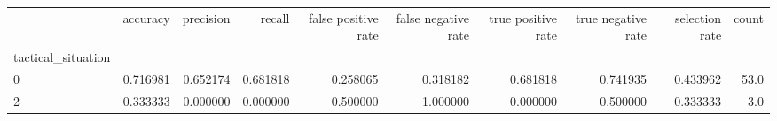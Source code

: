 \begin{tabular}{lrrrrrrrrr}
\toprule
{} &  accuracy &  precision &    recall &  false positive rate &  false negative rate &  true positive rate &  true negative rate &  selection rate &  count \\
tactical\_situation &           &            &           &                      &                      &                     &                     &                 &        \\
\midrule
0                  &  0.716981 &   0.652174 &  0.681818 &             0.258065 &             0.318182 &            0.681818 &            0.741935 &        0.433962 &   53.0 \\
2                  &  0.333333 &   0.000000 &  0.000000 &             0.500000 &             1.000000 &            0.000000 &            0.500000 &        0.333333 &    3.0 \\
\bottomrule
\end{tabular}
